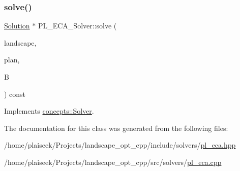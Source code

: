 \mbox{\label{class_p_l___e_c_a___solver_a7fe728bb23be76b4aa51e669b73ee10d}} 
\subsubsection{\texorpdfstring{solve()}{solve()}}
{\footnotesize\ttfamily \hyperlink{class_solution}{Solution} $\ast$ P\+L\+\_\+\+E\+C\+A\+\_\+\+Solver\+::solve (\begin{DoxyParamCaption}\item[{const \hyperlink{class_landscape}{Landscape} \&}]{landscape,  }\item[{const \hyperlink{class_restoration_plan}{Restoration\+Plan} \&}]{plan,  }\item[{const double}]{B }\end{DoxyParamCaption}) const\hspace{0.3cm}{\ttfamily [virtual]}}



Implements \hyperlink{classconcepts_1_1_solver_af323ad29df1e7b87facd7dc007568c80}{concepts\+::\+Solver}.



The documentation for this class was generated from the following files\+:\begin{DoxyCompactItemize}
\item 
/home/plaiseek/\+Projects/landscape\+\_\+opt\+\_\+cpp/include/solvers/\hyperlink{pl__eca_8hpp}{pl\+\_\+eca.\+hpp}\item 
/home/plaiseek/\+Projects/landscape\+\_\+opt\+\_\+cpp/src/solvers/\hyperlink{pl__eca_8cpp}{pl\+\_\+eca.\+cpp}\end{DoxyCompactItemize}
